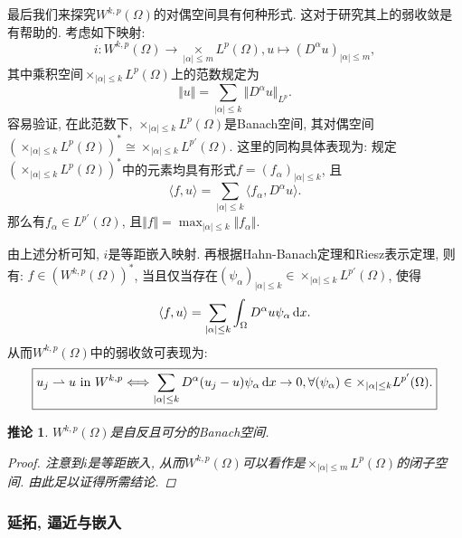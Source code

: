 \documentclass[12pt,a4paper]{article}
\newtheorem{corollary}[theorem]{推论}
\begin{document}
最后我们来探究$W^{k, p}(\Omega)$的对偶空间具有何种形式. 这对于研究其上的弱收敛是有帮助的.
考虑如下映射:
\begin{equation*}
    i\colon W^{k, p}(\Omega) \rightarrow \mathop{\times}\limits_{|\alpha| \leq m}L^p(\Omega), u \mapsto (D^{\alpha}u)_{|\alpha| \leq m},
\end{equation*}
其中乘积空间$\times_{|\alpha| \leq k}L^p(\Omega)$上的范数规定为
\begin{equation*}
    \Vert u \Vert = \sum_{|\alpha| \leq k}\Vert D^{\alpha}u \Vert_{L^p}.
\end{equation*}
容易验证, 在此范数下, $\times_{|\alpha| \leq k}L^p(\Omega)$是Banach空间, 其对偶空间$(\times_{|\alpha| \leq k}L^p(\Omega))^* \cong \times_{|\alpha| \leq k}L^{p'}(\Omega)$.
这里的同构具体表现为: 规定$(\times_{|\alpha| \leq k}L^p(\Omega))^*$中的元素均具有形式$f = (f_{\alpha})_{|\alpha| \leq k}$, 且 
\begin{equation*}
    \langle f, u\rangle = \sum_{|\alpha| \leq k}\langle f_{\alpha}, D^{\alpha}u\rangle.
\end{equation*} 
那么有$f_{\alpha} \in L^{p'}(\Omega)$, 且$\Vert f \Vert = \max_{|\alpha| \leq k}\Vert f_{\alpha} \Vert$.

由上述分析可知, $i$是等距嵌入映射. 再根据Hahn-Banach定理和Riesz表示定理, 则有: $f \in (W^{k, p}(\Omega))^*$, 当且仅当存在$(\psi_{\alpha})_{|\alpha| \leq k} \in \times_{|\alpha| \leq k}L^{p'}(\Omega)$, 使得
\begin{equation*}
    \langle f, u\rangle = \sum_{|\alpha| \leq k}\int_{\Omega}D^{\alpha}u\psi_{\alpha} \,{\rm d}x.
\end{equation*} 
从而$W^{k, p}(\Omega)$中的弱收敛可表现为:
\begin{equation*}
    \boxed{u_j \rightharpoonup u \ \text{in}\ W^{k, p} \Longleftrightarrow \sum_{|\alpha| \leq k}D^{\alpha}(u_j - u)\psi_{\alpha} \,{\rm d}x \rightarrow 0, \forall (\psi_{\alpha}) \in \times_{|\alpha| \leq k}L^{p'}(\Omega).}
\end{equation*}

\begin{corollary}
    $W^{k, p}(\Omega)$是自反且可分的Banach空间.
    \begin{proof}
        注意到$i$是等距嵌入, 从而$W^{k, p}(\Omega)$可以看作是$\times_{|\alpha| \leq m}L^p(\Omega)$的闭子空间.
        由此足以证得所需结论.
    \end{proof}
\end{corollary}

\subsubsection{延拓, 逼近与嵌入}
\end{document}
